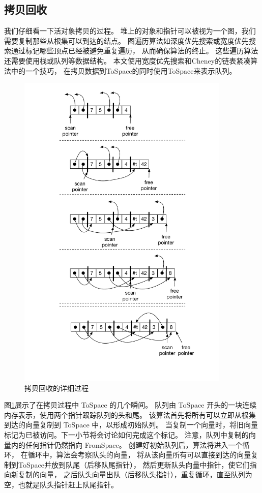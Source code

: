 \subsection{拷贝回收}

我们仔细看一下活对象拷贝的过程。
堆上的对象和指针可以被视为一个图，我们需要复制那些从根集可以到达的结点。
图遍历算法如深度优先搜索或宽度优先搜索通过标记哪些顶点已经被避免重复遍历，
从而确保算法的终止。
这些遍历算法还需要使用栈或队列等数据结构。
本文使用宽度优先搜索和Cheney\cite{Cheney_1970}的链表紧凑算法中的一个技巧，
在拷贝数据到ToSpace的同时使用ToSpace来表示队列。

\begin{figure}[tbp]
\centering
\includegraphics[width=0.9\textwidth]{figures/cheney}
\caption{拷贝回收的详细过程}
\label{fig:cheney}
\end{figure}

图\ref{fig:cheney}展示了在拷贝过程中 ToSpace 的几个瞬间。
队列由 ToSpace 开头的一块连续内存表示，使用两个指针跟踪队列的头和尾。
该算法首先将所有可以立即从根集到达的向量复制到 ToSpace 中，以形成初始队列。
当复制一个向量时，将旧向量标记为已被访问。下一小节将会讨论如何完成这个标记。
注意，队列中复制的向量内的任何指针仍然指向 FromSpace。
创建好初始队列后，算法将进入一个循环，
在循环中，算法会考察队头的向量，
将从该向量所有可以直接到达的向量复制到ToSpace并放到队尾（后移队尾指针），
然后更新队头向量中指针，使它们指向新复制的向量，
之后队头向量出队（后移队头指针），重复循环，直至队列为空，也就是队头指针赶上队尾指针。

